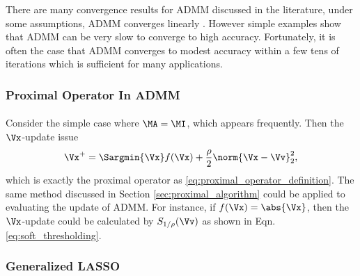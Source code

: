 \documentclass[
10pt, %
a4paper, %
oneside, %
headinclude,footinclude, %
BCOR5mm, %
]{scrartcl}
\begin{document}
There are many convergence results for ADMM discussed in the 
literature, under some assumptions, ADMM converges linearly 
\cite{nishihara2015general}. However simple examples show that ADMM can be very 
slow to converge to high accuracy. Fortunately, it is often the case that ADMM 
converges to modest accuracy within a few tens of iterations which is sufficient 
for many applications. 

\subsubsection{Proximal Operator In ADMM}
\paragraph{}
Consider the simple case where $\MA = \MI$, which appears frequently. Then the 
$\Vx$-update issue
\begin{equation*}
	\Vx^{+} = \Sargmin{\Vx}  f(\Vx) + \frac{\rho}{2} \norm{\Vx - \Vv}_2^2,
\end{equation*}
which is exactly the proximal operator as 
\eqref{eq:proximal_operator_definition}. The same method discussed 
in Section \ref{sec:proximal_algorithm} could be applied to evaluating 
the update of ADMM. For instance, if $ f(\Vx) = \abs{\Vx} $, then the 
$\Vx$-update could be calculated by $S_{1 / \rho}(\Vv)$ as shown in 
Eqn. \eqref{eq:soft_thresholding}.

\subsubsection{Generalized LASSO}
\end{document}
